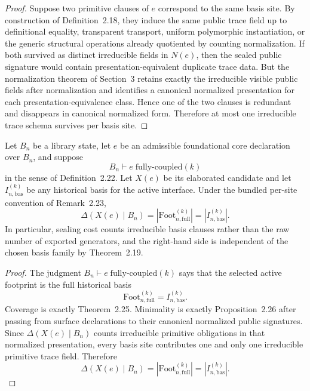 \begin{proof}
Suppose two primitive clauses of \(e\) correspond to the same basis site.  By construction of
Definition~2.18, they induce the same public trace field up to definitional equality,
transparent transport, uniform polymorphic instantiation, or the generic structural
operations already quotiented by counting normalization.  If both survived as distinct
irreducible fields in \(N(e)\), then the sealed public signature would contain
presentation-equivalent duplicate trace data.  But the normalization theorem of Section~3
retains exactly the irreducible visible public fields after normalization and identifies a
canonical normalized presentation for each presentation-equivalence class.  Hence one of the
two clauses is redundant and disappears in canonical normalized form.  Therefore at most one
irreducible trace schema survives per basis site.
\end{proof}

\begin{theorem}
Let \(B_n\) be a library state, let \(e\) be an admissible foundational core declaration over
\(B_n\), and suppose
\[
  B_n \vdash e\;\mathrm{fully\mbox{-}coupled}(k)
\]
in the sense of Definition~2.22.  Let \(X(e)\) be its elaborated candidate and let
\(I_{n,\mathrm{bas}}^{(k)}\) be any historical basis for the active interface.  Under the bundled
per-site convention of Remark~2.23,
\[
  \Delta(X(e)\mid B_n)
  = |\mathrm{Foot}^{(k)}_{n,\mathrm{full}}|
  = |I_{n,\mathrm{bas}}^{(k)}|.
\]
In particular, sealing cost counts irreducible basis clauses rather than the raw number of
exported generators, and the right-hand side is independent of the chosen basis family by
Theorem~2.19.
\end{theorem}

\begin{proof}
The judgment \(B_n\vdash e\;\mathrm{fully\mbox{-}coupled}(k)\) says that the selected active
footprint is the full historical basis
\[
  \mathrm{Foot}^{(k)}_{n,\mathrm{full}} = I_{n,\mathrm{bas}}^{(k)}.
\]
Coverage is exactly Theorem~2.25.  Minimality is exactly Proposition~2.26 after passing from
surface declarations to their canonical normalized public signatures.  Since
\(\Delta(X(e)\mid B_n)\) counts irreducible primitive obligations in that normalized
presentation, every basis site contributes one and only one irreducible primitive trace field.
Therefore
\[
  \Delta(X(e)\mid B_n)
  = |\mathrm{Foot}^{(k)}_{n,\mathrm{full}}|
  = |I_{n,\mathrm{bas}}^{(k)}|.
\]
\end{proof}

